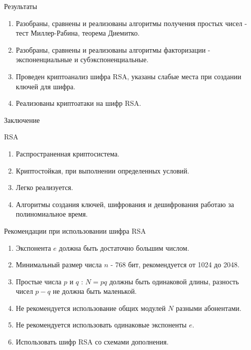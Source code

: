 
\begin{frame}{Результаты}
	\begin{center}
		\begin{enumerate}
			\item Разобраны, сравнены и реализованы алгоритмы получения простых чисел - тест Миллер-Рабина, теорема Диемитко. \vspace{0.5cm}
			\item Разобраны, сравнены и реализованы алгоритмы факторизации - экспоненциальные и субэкспоненциальные. \vspace{0.5cm}
			\item Проведен криптоанализ шифра RSA, указаны слабые места при создании ключей для шифра. \vspace{0.5cm}
			\item Реализованы криптоатаки на шифр RSA.
		\end{enumerate}
	\end{center}
\end{frame}

\begin{frame}{Заключение}

	\changefontsizes{8pt}

	\begin{center}		

		\begin{block}{RSA}
			\begin{enumerate}
				\item Распространенная криптосистема.
				\item Криптостойкая, при выполнении определенных условий.
				\item Легко реализуется.
				\item Алгоритмы создания ключей, шифрования и дешифрования работаю за полиномиальное время.
			\end{enumerate}	
		\end{block}

		\begin{block}{Рекомендации при использовании шифра RSA}
			\begin{enumerate}
				\item Экспонента $e$ должна быть достаточно большим числом.
				\item Минимальный размер числа $n$ - 768 бит, рекомендуется от 1024 до 2048.
				\item Простые числа $p$ и $q$ : $N=pq$ должны быть одинаковой длины, разность чисел $p - q$ не должна быть маленькой.
				\item Не рекомендуется использование общих модулей $N$ разными абонентами.
				\item Не рекомендуется использовать одинаковые экспоненты $e$.
				\item Использовать шифр RSA со схемами дополнения.
			\end{enumerate}	
		\end{block}
	\end{center}

	\changefontsizes{13pt}

\end{frame}

